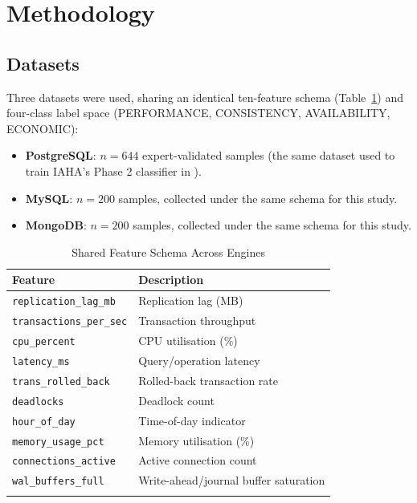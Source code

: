 \documentclass[pdflatex,sn-mathphys-num]{sn-jnl}
\theoremstyle{thmstyleone}
\theoremstyle{thmstylethree}
\begin{document}
\section{Methodology}\label{sec:methodology}

\subsection{Datasets}\label{subsec:datasets}

Three datasets were used, sharing an identical ten-feature schema
(Table~\ref{tab:features}) and four-class label space (PERFORMANCE,
CONSISTENCY, AVAILABILITY, ECONOMIC):

\begin{itemize}
\item \textbf{PostgreSQL}: $n = 644$ expert-validated samples
  (the same dataset used to train IAHA's Phase 2 classifier
  in \cite{iaha2026}).
\item \textbf{MySQL}: $n = 200$ samples, collected under the same
  schema for this study.
\item \textbf{MongoDB}: $n = 200$ samples, collected under the same
  schema for this study.
\end{itemize}

\begin{table}[h]
\caption{Shared Feature Schema Across Engines}\label{tab:features}
\begin{tabular}{@{}ll@{}}
\toprule
Feature & Description \\
\midrule
\texttt{replication\_lag\_mb} & Replication lag (MB) \\
\texttt{transactions\_per\_sec} & Transaction throughput \\
\texttt{cpu\_percent} & CPU utilisation (\%) \\
\texttt{latency\_ms} & Query/operation latency \\
\texttt{trans\_rolled\_back} & Rolled-back transaction rate \\
\texttt{deadlocks} & Deadlock count \\
\texttt{hour\_of\_day} & Time-of-day indicator \\
\texttt{memory\_usage\_pct} & Memory utilisation (\%) \\
\texttt{connections\_active} & Active connection count \\
\texttt{wal\_buffers\_full} & Write-ahead/journal buffer saturation \\
\botrule
\end{tabular}
\end{table}
\end{document}
